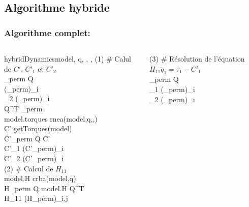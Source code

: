\documentclass[10pt]{beamer}
\begin{document}
\subsection{Algorithme hybride}

\begin{frame}
	\frametitle{Algorithme complet:}

	  
	\begin{spacing}{1.5}
	\begin{columns}[T]\scriptsize
	\begin{column}{.48\textwidth}
	\begin{pseudocode}{hybridDynamics}{model, q, , , \tau}
	(1)
	\BEGIN
	  \textnormal{\# Calul de $C'$, $C'_1$ et $C'_2$} \\
	  _{perm} \GETS Q  \\
	  (_{perm})_{i \in [1,fd]}  \\
	  _2 \GETS (_{perm})_{i \in [fd+1,n_{dof}]} \\
	   \GETS Q^T _{perm} \\
	  model.torques \GETS rnea(model,q,,) \\
	  C' \GETS getTorques(model) \\
	  C'_{perm} \GETS Q C'\\
	  C'_1 \GETS (C'_{perm})_{i \in [1,fd]} \\
	  C'_2 \GETS (C'_{perm})_{i \in [fd+1,n_{dof}]}
	\END \\
	(2)
	\BEGIN
	  \textnormal{\# Calcul de $H_{11}$} \\
	  model.H \GETS crba(model,q) \\
	  H_{perm} \GETS Q model.H Q^T \\
	  H_{11} \GETS (H_{perm})_{i,j \in [1,fd]} 
	\END 
	\end{pseudocode}
	\end{column}
	\begin{column}{.48\textwidth}
	\begin{pseudocode}{ }{ }
	(3) 
	\BEGIN
	  \textnormal{\# Résolution de l'équation $H_{11} \ddot{q}_1 = \tau_1 - C'_1$} \\
	  \tau_{perm} \GETS Q \tau \\
	  \tau_1 \GETS (\tau_{perm})_{i \in [1,fd]} \\
	  \tau_2 \GETS (\tau_{perm})_{i \in [fd+1,n_{dof}]} \\

\end{pseudocode}
\end{column}
\end{columns}
\end{spacing}
\end{frame}
\end{document}

